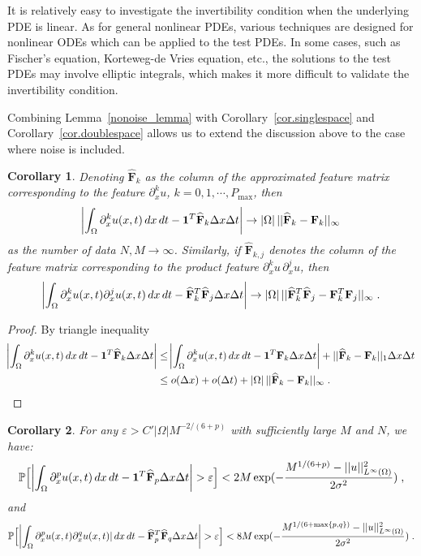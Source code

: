\documentclass[a4paper,11pt]{article}
\newcommand{\bF}{\mathbf{F}}
\newtheorem{corollary}{Corollary}[section]
\begin{document}
It is relatively easy to investigate the invertibility condition when the underlying PDE is linear. As for general nonlinear PDEs, various techniques are designed for nonlinear ODEs which can be applied to the test PDEs. In some cases, such as Fischer's equation, Korteweg-de Vries equation, etc., the solutions to the test PDEs may involve elliptic integrals, which makes it more difficult to validate the invertibility condition.

Combining Lemma~\ref{nonoise_lemma} with Corollary~\ref{cor.singlespace} and Corollary~\ref{cor.doublespace} allows us to extend the discussion above to the case where noise is included.
\begin{corollary}
Denoting $\widehat{\bF}_k$ as the column of the approximated feature matrix corresponding to the feature $\partial_x^k u$, $k=0,1,\cdots,P_{\max}$, then
\begin{align}
	\abs{\int_\Omega\partial_x^ku(x,t)\,dx\,dt-\mathbf{1}^T\widehat{\bF}_k\Delta x\Delta t}\to |\Omega|\,||\widehat{\bF}_k-\bF_k||_\infty
\end{align}
as the number of data $N,M\to\infty$. Similarly, if $\widehat{\bF}_{k,j}$ denotes the column of the feature matrix corresponding to the product feature $\partial_x^ku\,\partial_x^ju$, then
\begin{align}
	\abs{\int_\Omega\partial_x^ku(x,t)\partial_x^ju(x,t)\,dx\,dt-\widehat{\bF}_{k}^T\widehat{\bF}_{j}\Delta x\Delta t}\to |\Omega|\,||\widehat{\bF}^T_{k}\widehat{\bF}_{j}-\bF^T_{k}\bF_{j}||_\infty\;.
\end{align}

\end{corollary}
\begin{proof} By triangle inequality
\begin{align*}
	\abs{\int_\Omega \partial_x^ku(x,t)\,dx\,dt-\mathbf{1}^T\widehat{\bF}_k\Delta x\Delta t}&\leq \abs{\int_\Omega\partial_x^ku(x,t)\,dx\,dt-\mathbf{1}^T\bF_k\Delta x\Delta t}+||\widehat{\bF}_k-\bF_k||_1\Delta x\Delta t\\
	&\leq o(\Delta x) + o(\Delta t)+|\Omega|\,||\widehat{\bF}_k-\bF_k||_\infty\;.
\end{align*}
\end{proof}
\begin{corollary}
For any $\varepsilon >C'|\Omega|M^{-2/(6+p)}$ with sufficiently large $M$ and $N$, we have:
\begin{align}
\mathbb{P}\Big[\abs{\int_\Omega\partial_x^pu(x,t)\,dx\,dt-\mathbf{1}^T\widehat{\bF}_p\Delta x\Delta t}>\varepsilon\Big]<2M\exp(-\frac{M^{1/(6+p)}-||u||_{L^\infty(\Omega)}^2}{2\sigma^2})\;,
\end{align}
and
\begin{align}
\mathbb{P}\Big[\abs{\int_\Omega\partial_x^pu(x,t)\partial_x^qu(x,t)|\,dx\,dt-\widehat{\bF}^T_p\widehat{\bF}_q\Delta x\Delta t}>\varepsilon\Big]<8M\exp(-\frac{M^{1/(6+\max\{p,q\})}-||u||_{L^\infty(\Omega)}^2}{2\sigma^2})\;.
\end{align}
\end{corollary}
\end{document}
